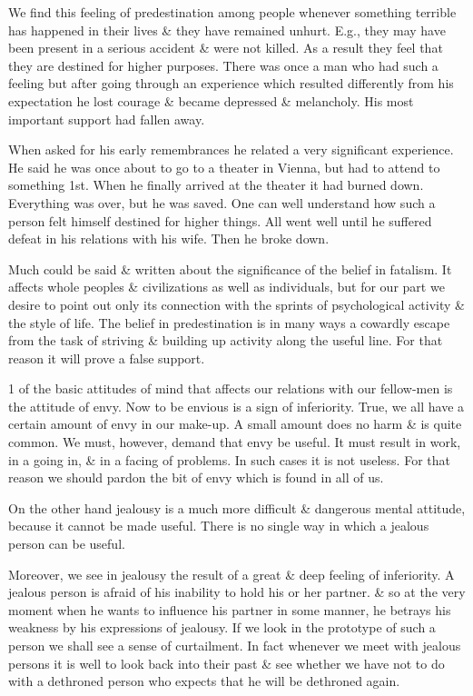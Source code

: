 \documentclass{article}
\begin{document}
We find this feeling of predestination among people whenever something terrible has happened in their lives \& they have remained unhurt. E.g., they may have been present in a serious accident \& were not killed. As a result they feel that they are destined for higher purposes. There was once a man who had such a feeling but after going through an experience which resulted differently from his expectation he lost courage \& became depressed \& melancholy. His most important support had fallen away.

When asked for his early remembrances he related a very significant experience. He said he was once about to go to a theater in Vienna, but had to attend to something 1st. When he finally arrived at the theater it had burned down. Everything was over, but he was saved. One can well understand how such a person felt himself destined for higher things. All went well until he suffered defeat in his relations with his wife. Then he broke down.

Much could be said \& written about the significance of the belief in fatalism. It affects whole peoples \& civilizations as well as individuals, but for our part we desire to point out only its connection with the sprints of psychological activity \& the style of life. The belief in predestination is in many ways a cowardly escape from the task of striving \& building up activity along the useful line. For that reason it will prove a false support.

1 of the basic attitudes of mind that affects our relations with our fellow-men is the attitude of envy. Now to be envious is a sign of inferiority. True, we all have a certain amount of envy in our make-up. A small amount does no harm \& is quite common. We must, however, demand that envy be useful. It must result in work, in a going in, \& in a facing of problems. In such cases it is not useless. For that reason we should pardon the bit of envy which is found in all of us.

On the other hand jealousy is a much more difficult \& dangerous mental attitude, because it cannot be made useful. There is no single way in which a jealous person can be useful.

Moreover, we see in jealousy the result of a great \& deep feeling of inferiority. A jealous person is afraid of his inability to hold his or her partner. \& so at the very moment when he wants to influence his partner in some manner, he betrays his weakness by his expressions of jealousy. If we look in the prototype of such a person we shall see a sense of curtailment. In fact whenever we meet with jealous persons it is well to look back into their past \& see whether we have not to do with a dethroned person who expects that he will be dethroned again.
\end{document}
